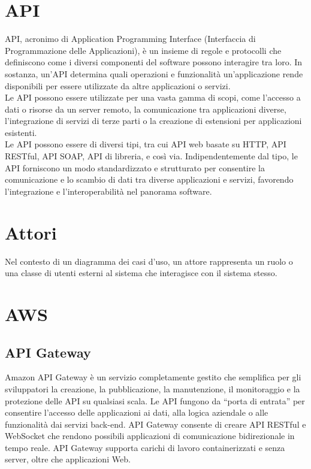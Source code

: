\documentclass{article}
\begin{document}
\section{API}
API, acronimo di Application Programming Interface (Interfaccia di Programmazione delle Applicazioni), è un insieme di regole e protocolli che definiscono come i diversi componenti del software possono interagire tra loro. In sostanza, un'API determina quali operazioni e funzionalità un'applicazione rende disponibili per essere utilizzate da altre applicazioni o servizi.\\
Le API possono essere utilizzate per una vasta gamma di scopi, come l'accesso a dati o risorse da un server remoto, la comunicazione tra applicazioni diverse, l'integrazione di servizi di terze parti o la creazione di estensioni per applicazioni esistenti.\\
Le API possono essere di diversi tipi, tra cui API web basate su HTTP, API RESTful, API SOAP, API di libreria, e così via. Indipendentemente dal tipo, le API forniscono un modo standardizzato e strutturato per consentire la comunicazione e lo scambio di dati tra diverse applicazioni e servizi, favorendo l'integrazione e l'interoperabilità nel panorama software.

\section{Attori}
Nel contesto di un diagramma dei casi d'uso, un attore rappresenta un ruolo o una classe di utenti esterni al sistema che interagisce con il sistema stesso.

\section{AWS}
\subsection{API Gateway}
Amazon API Gateway è un servizio completamente gestito che semplifica per gli sviluppatori la creazione, la pubblicazione, la manutenzione, il monitoraggio e la protezione delle API su qualsiasi scala. Le API fungono da “porta di entrata” per consentire l’accesso delle applicazioni ai dati, alla logica aziendale o alle funzionalità dai servizi back-end. API Gateway consente di creare API RESTful e WebSocket che rendono possibili applicazioni di comunicazione bidirezionale in tempo reale. API Gateway supporta carichi di lavoro containerizzati e senza server, oltre che applicazioni Web.
\end{document}
